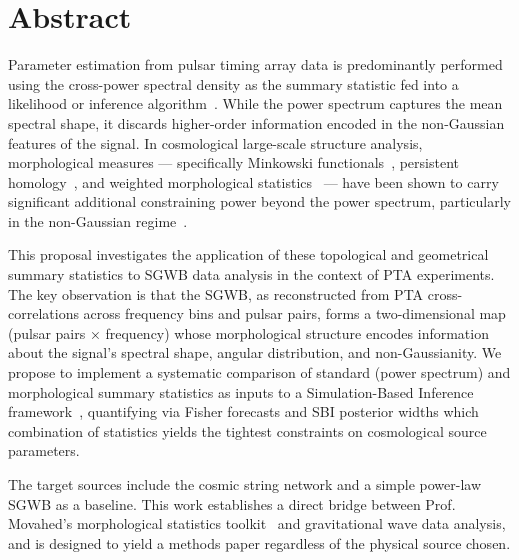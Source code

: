 \section{Abstract}\label{sec:2-abstract}
Parameter estimation from pulsar timing array data is predominantly performed using the cross-power spectral density as the summary statistic fed into a likelihood or inference algorithm~\cite{renzini_stochastic_2022}.
While the power spectrum captures the mean spectral shape, it discards higher-order information encoded in the non-Gaussian features of the signal.
In cosmological large-scale structure analysis, morphological measures — specifically Minkowski functionals~\cite{mecke_robust_1994}, persistent homology~\cite{edelsbrunner_topological_2002}, and weighted morphological statistics~\cite{klatt_characterization_2022} — have been shown to carry significant additional constraining power beyond the power spectrum, particularly in the non-Gaussian regime~\cite{jalali_kanafi_imprint_2024,yip_cosmology_2024}.

This proposal investigates the application of these topological and geometrical summary statistics to SGWB data analysis in the context of PTA experiments.
The key observation is that the SGWB, as reconstructed from PTA cross-correlations across frequency bins and pulsar pairs, forms a two-dimensional map (pulsar pairs × frequency) whose morphological structure encodes information about the signal's spectral shape, angular distribution, and non-Gaussianity.
We propose to implement a systematic comparison of standard (power spectrum) and morphological summary statistics as inputs to a Simulation-Based Inference framework~\cite{cranmer_frontier_2020}, quantifying via Fisher forecasts and SBI posterior widths which combination of statistics yields the tightest constraints on cosmological source parameters.

The target sources include the cosmic string network and a simple power-law SGWB as a baseline.
This work establishes a direct bridge between Prof.
Movahed's morphological statistics toolkit~\cite{jalali_kanafi_imprint_2024,abedi_impact_2024} and gravitational wave data analysis, and is designed to yield a methods paper regardless of the physical source chosen.


